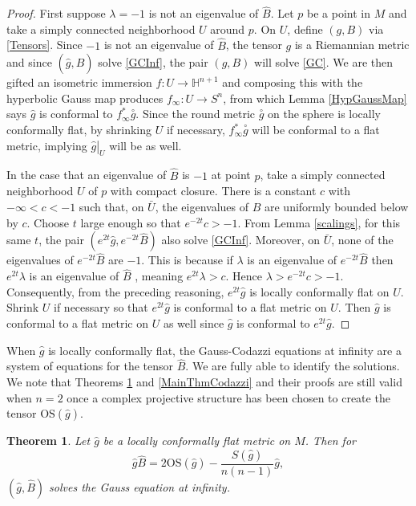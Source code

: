\documentclass{amsart}
\newtheorem{thm}{Theorem}[section]
\renewcommand{\H}{\mathbb{H}}
\begin{document}
\begin{proof}
First suppose $\lambda = -1$ is not an eigenvalue of $\hat{B}$.
Let $p$ be a point in $M$ and take a simply connected neighborhood $U$ around $p$.
On $U$, define $(g,B)$ via \eqref{Tensors}.
Since $-1$ is not an eigenvalue of $\hat{B}$, the tensor $g$ is a Riemannian metric and since $(\hat{g},\hat{B})$ solve \ref{GCInf}, the pair $(g,B)$ will solve \ref{GC}.
We are then gifted an isometric immersion $f: U \to \H^{n+1}$ and composing this with the hyperbolic Gauss map produces $f_\infty:U \to S^n$, from which Lemma \ref{HypGaussMap} says $\hat{g}$ is conformal to $f_\infty^*\overset{\circ}{g}$.
Since the round metric $\overset{\circ}{g}$ on the sphere is locally conformally flat, by shrinking $U$ if necessary, $f_\infty^*\overset{\circ}{g}$ will be conformal to a flat metric, implying $\left.\hat{g}\right|_{U}$ will be as well. 

In the case that an eigenvalue of $\hat{B}$ is $-1$ at point $p$, take a simply connected neighborhood $U$ of $p$ with compact closure.
There is a constant $c$ with $-\infty < c < -1$ such that, on $\bar{U}$, the eigenvalues of $\hat{B}$ are uniformly bounded below by $c$. 
Choose $t$ large enough so that $e^{-2t}c > -1$. 
From Lemma \ref{scalings}, for this same $t$, the pair $(e^{2t}\hat{g},e^{-2t}\hat{B})$ also solve \ref{GCInf}. 
Moreover, on $\bar{U}$, none of the eigenvalues of $e^{-2t}\hat{B}$ are $-1$. 
This is because if $\lambda$ is an eigenvalue of $e^{-2t}\hat{B}$ then $e^{2t}\lambda$ is an eigenvalue of $\hat{B}$ , meaning $e^{2t}\lambda > c$.
Hence $\lambda > e^{-2t}c > -1$.
Consequently, from the preceding reasoning, $e^{2t}\hat{g}$ is locally conformally flat on $U$.
Shrink $U$ if necessary so that $e^{2t}\hat{g}$ is conformal to a flat metric on $U$. 
Then $\hat{g}$ is conformal to a flat metric on $U$ as well since $\hat{g}$ is conformal to $e^{2t}\hat{g}$.
\end{proof}

When $\hat{g}$ is locally conformally flat, the Gauss-Codazzi equations at infinity are a system of equations for the tensor $\hat{B}$.
We are fully able to identify the solutions.
We note that Theorems \ref{MainThmGauss} and \ref{MainThmCodazzi} and their proofs are still valid when $n = 2$ once a complex projective structure has been chosen to create the tensor $\mathrm{OS}(\hat{g})$.


\begin{thm}
\label{MainThmGauss}
Let $\hat{g}$ be a locally conformally flat metric on $M$. Then for 
\[
\hat{g} \hat{B} = 2\mathrm{OS}(\hat{g}) - \frac{S(\hat{g})}{n(n-1)}\hat{g},
\]
$(\hat{g},\hat{B})$ solves the Gauss equation at infinity.
\end{thm}
\end{document}
